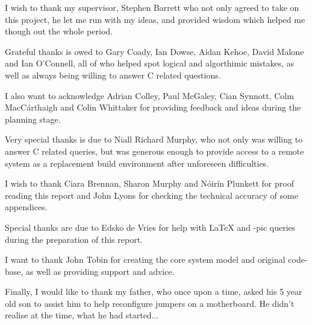 
I wish to thank my supervisor, Stephen Barrett who not only
agreed to take on this project, he let me run with my ideas, and 
provided wisdom which helped me though out the whole period.


Grateful thanks is owed to Gary Coady, Ian Dowse, Aidan Kehoe, David 
Malone and Ian O'Connell, all of who helped spot logical and 
algorthimic mistakes, as well as always being willing to answer C 
related questions.


I also want to acknowledge Adrian Colley, Paul McGaley, Cian Synnott, 
Colm MacC\'{a}rthaigh and Colin Whittaker for providing feedback and 
ideas during the planning stage.


Very special thanks is due to Niall Richard Murphy, who not only was 
willing to answer C related queries, but was generous enough to provide 
access to a remote system as a replacement build environment after 
unforeseen difficulties.


I wish to thank Ciara Brennan, Sharon Murphy and N\'{o}ir\'{i}n Plunkett
for proof reading this report and John Lyons for checking the technical
accuracy of some appendices. 


Special thanks are due to Edsko de Vries for help with \textrm{\LaTeX{}} 
and \textrm{\Xy-pic} queries during the preparation of this report.


I want to thank John Tobin for creating the core system model and 
original code-base, as well as providing support and advice. 


Finally, I would like to thank my father, who once upon a time, 
asked his 5 year old son to assist him to help reconfigure jumpers on
a motherboard. He didn't realise at the time, what he had started...
